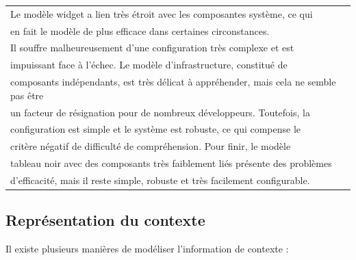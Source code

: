 {%
    \centering
    \begin{tabular}{l}
        Le modèle widget a lien très étroit avec les composantes système, ce qui
        \\ en fait le modèle de plus efficace dans certaines circonstances. \\
        Il souffre malheureusement d'une configuration très complexe et est \\
        impuissant face à l'échec. Le modèle d'infrastructure, constitué de \\
        composants indépendants, est très délicat à appréhender, mais cela ne
        semble pas être \\ un facteur de résignation pour de nombreux
        développeurs. Toutefois, la \\ configuration est simple et le système
        est robuste, ce qui compense le \\ critère négatif de difficulté de
        compréhension. Pour finir, le modèle \\ tableau noir avec des composants
        très faiblement liés présente des problèmes \\ d'efficacité, mais il
        reste simple, robuste et très facilement configurable.
        \cite{winograd_architectures_2001} \\
    \end{tabular}
\par}%

\subsection{Représentation du contexte}

Il existe plusieurs manières de modéliser l'information de contexte :

